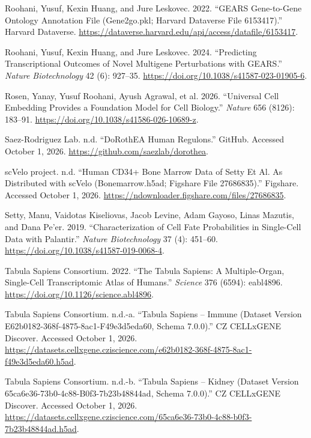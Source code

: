 \documentclass[
  11pt,
]{article}
\newlength{\cslhangindent}
\newenvironment{CSLReferences}[2] %
 {\begin{list}{}{%
  \setlength{\itemindent}{0pt}
  \setlength{\leftmargin}{0pt}
  \setlength{\parsep}{0pt}
  \ifodd #1
   \setlength{\leftmargin}{\cslhangindent}
   \setlength{\itemindent}{-1\cslhangindent}
  \fi
  \setlength{\itemsep}{#2\baselineskip}}}
 {\end{list}}
\begin{document}
\begin{CSLReferences}{1}{1}
Roohani, Yusuf, Kexin Huang, and Jure Leskovec. 2022. {``{GEARS}
Gene-to-{Gene Ontology} Annotation File (Gene2go.pkl; Harvard Dataverse
File 6153417).''} Harvard Dataverse.
\url{https://dataverse.harvard.edu/api/access/datafile/6153417}.

Roohani, Yusuf, Kexin Huang, and Jure Leskovec. 2024. {``Predicting
Transcriptional Outcomes of Novel Multigene Perturbations with
{GEARS}.''} \emph{Nature Biotechnology} 42 (6): 927--35.
\url{https://doi.org/10.1038/s41587-023-01905-6}.

Rosen, Yanay, Yusuf Roohani, Ayush Agrawal, et al. 2026. {``Universal
Cell Embedding Provides a Foundation Model for Cell Biology.''}
\emph{Nature} 656 (8126): 183--91.
\url{https://doi.org/10.1038/s41586-026-10689-z}.

Saez-Rodriguez Lab. n.d. {``{DoRothEA} Human Regulons.''} GitHub.
Accessed October 1, 2026. \url{https://github.com/saezlab/dorothea}.

{scVelo project}. n.d. {``Human {CD34+} Bone Marrow Data of {Setty} Et
Al. As Distributed with {scVelo} (Bonemarrow.h5ad; Figshare File
27686835).''} Figshare. Accessed October 1, 2026.
\url{https://ndownloader.figshare.com/files/27686835}.

Setty, Manu, Vaidotas Kiseliovas, Jacob Levine, Adam Gayoso, Linas
Mazutis, and Dana Pe'er. 2019. {``Characterization of Cell Fate
Probabilities in Single-Cell Data with {Palantir}.''} \emph{Nature
Biotechnology} 37 (4): 451--60.
\url{https://doi.org/10.1038/s41587-019-0068-4}.

Tabula Sapiens Consortium. 2022. {``The {Tabula Sapiens}: A
Multiple-Organ, Single-Cell Transcriptomic Atlas of Humans.''}
\emph{Science} 376 (6594): eabl4896.
\url{https://doi.org/10.1126/science.abl4896}.

Tabula Sapiens Consortium. n.d.-a. {``Tabula {Sapiens} -- Immune
(Dataset Version E62b0182-368f-4875-8ac1-F49e3d5eda60, Schema 7.0.0).''}
CZ CELLxGENE Discover. Accessed October 1, 2026.
\url{https://datasets.cellxgene.cziscience.com/e62b0182-368f-4875-8ac1-f49e3d5eda60.h5ad}.

Tabula Sapiens Consortium. n.d.-b. {``Tabula {Sapiens} -- Kidney
(Dataset Version 65ca6e36-73b0-4c88-B0f3-7b23b48844ad, Schema 7.0.0).''}
CZ CELLxGENE Discover. Accessed October 1, 2026.
\url{https://datasets.cellxgene.cziscience.com/65ca6e36-73b0-4c88-b0f3-7b23b48844ad.h5ad}.


\end{CSLReferences}
\end{document}
